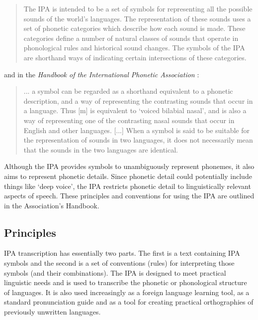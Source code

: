 \begin{quote}
The IPA is intended to be a set of symbols for representing all the possible 
sounds of the world's languages. The representation of these sounds uses a set 
of phonetic categories which describe how each sound is made. These categories 
define a number of natural classes of sounds that operate in phonological rules 
and historical sound changes. The symbols of the IPA are shorthand ways of 
indicating certain intersections of these categories.
\end{quote}

\noindent and in the \textit{Handbook of the International Phonetic Association} \citep[18]{IPA1993}: 

\begin{quote}
... a symbol can be regarded as a shorthand equivalent to a phonetic description, 
and a way of representing the contrasting sounds that occur in a language. Thus 
[m] is equivalent to `voiced bilabial nasal', and is also a way of representing 
one of the contrasting nasal sounds that occur in English and other languages. 
[...] When a symbol is said to be suitable for the representation of sounds in 
two languages, it does not necessarily mean that the sounds in the two languages 
are identical.
\end{quote}

\noindent Although the IPA provides symbols to unambiguously represent phonemes, 
it also aims to represent phonetic details. Since phonetic detail could potentially 
include things like `deep voice', the IPA restricts phonetic detail to linguistically 
relevant aspects of speech. These principles and conventions for using the IPA are 
outlined in the Association's Handbook.


\subsection{Principles}

IPA transcription has essentially two parts. The first is a text containing IPA 
symbols and the second is a set of conventions (rules) for interpreting those 
symbols (and their combinations). The IPA is designed to meet practical linguistic 
needs and is used to transcribe the phonetic or phonological structure of languages. 
It is also used increasingly as a foreign language learning tool, as a standard 
pronunciation guide and as a tool for creating practical orthographies of 
previously unwritten languages. 

